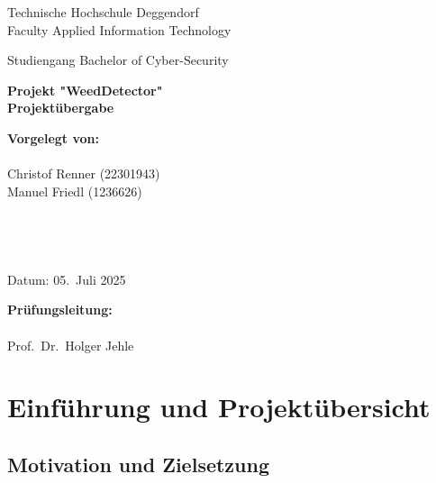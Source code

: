 \documentclass[12pt, a4paper]{scrreprt}
\newcommand{\faculty}{Faculty Applied Information Technology}
\newcommand{\studies}{Bachelor of Cyber-Security}
\newcommand{\thesistitleDE}{Projekt "WeedDetector" \\ Projektübergabe}
\newcommand{\submissiondate}{05.\ Juli 2025}
\newcommand{\supervisor}{Prof.\ Dr.\ Holger Jehle}
\begin{document}
\begin{titlepage}
  \centering
  {\LARGE Technische Hochschule Deggendorf \\ \faculty \par}
  \vspace{0.3cm}
  {\Large Studiengang \studies \\[1.5cm]}
  {\Huge\bfseries \thesistitleDE\par}
  \vfill
  \begin{minipage}[t]{0.45\textwidth}
    \textbf{Vorgelegt von:}\\
    \\
    Christof Renner (22301943)\\
    Manuel Friedl (1236626)\\
    \\
    \\
    \\
    \\
    Datum: \submissiondate
  \end{minipage}\hfill
  \begin{minipage}[t]{0.45\textwidth}
    \textbf{Prüfungsleitung:}\\
    \\
    \supervisor
  \end{minipage}
\end{titlepage}

\tableofcontents
\newpage

\chapter{Einführung und Projektübersicht}

\section{Motivation und Zielsetzung}
\end{document}
